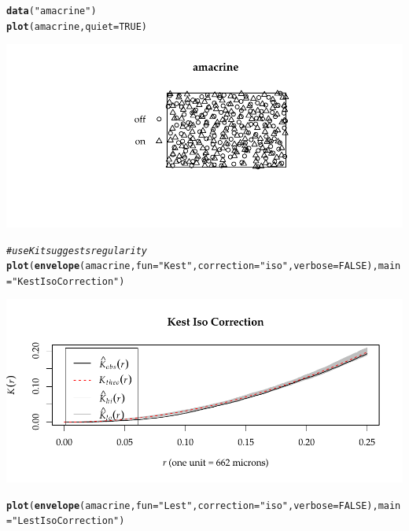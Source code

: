 \documentclass{article}\usepackage[]{graphicx}\usepackage[]{color}
\makeatletter
\def\maxwidth{ %
  \ifdim\Gin@nat@width>\linewidth
    \linewidth
  \else
    \Gin@nat@width
  \fi
}
\newcommand{\hlnum}[1]{\textcolor[rgb]{0.686,0.059,0.569}{#1}}%
\newcommand{\hlstr}[1]{\textcolor[rgb]{0.192,0.494,0.8}{#1}}%
\newcommand{\hlcom}[1]{\textcolor[rgb]{0.678,0.584,0.686}{\textit{#1}}}%
\newcommand{\hlstd}[1]{\textcolor[rgb]{0.345,0.345,0.345}{#1}}%
\newcommand{\hlkwc}[1]{\textcolor[rgb]{0.333,0.667,0.333}{#1}}%
\newcommand{\hlkwd}[1]{\textcolor[rgb]{0.737,0.353,0.396}{\textbf{#1}}}%
\newenvironment{kframe}{%
 \def\at@end@of@kframe{}%
 \ifinner\ifhmode%
  \def\at@end@of@kframe{\end{minipage}}%
  \begin{minipage}{\columnwidth}%
 \fi\fi%
 \def\FrameCommand##1{\hskip\@totalleftmargin \hskip-\fboxsep
 \colorbox{shadecolor}{##1}\hskip-\fboxsep
     \hskip-\linewidth \hskip-\@totalleftmargin \hskip\columnwidth}%
 \MakeFramed {\advance\hsize-\width
   \@totalleftmargin\z@ \linewidth\hsize
   \@setminipage}}%
 {\par\unskip\endMakeFramed%
 \at@end@of@kframe}
\newenvironment{knitrout}{}{} %
\makeatother
\begin{document}
\begin{enumerate}
\begin{knitrout}\footnotesize
{}\color{fgcolor}\begin{kframe}
\begin{alltt}
\hlkwd{data}\hlstd{(}\hlstr{"amacrine"}\hlstd{)}
\hlkwd{plot}\hlstd{(amacrine,} \hlkwc{quiet} \hlstd{=} \hlnum{TRUE}\hlstd{)}
\end{alltt}
\end{kframe}

{\centering \includegraphics[width=\maxwidth]{figure/prob3-1} 

}


\begin{kframe}\begin{alltt}
\hlcom{#use K it suggests regularity}
\hlkwd{plot}\hlstd{(}\hlkwd{envelope}\hlstd{(amacrine,} \hlkwc{fun} \hlstd{=} \hlstr{"Kest"}\hlstd{,} \hlkwc{correction} \hlstd{=} \hlstr{"iso"}\hlstd{,} \hlkwc{verbose} \hlstd{=} \hlnum{FALSE}\hlstd{),} \hlkwc{main} \hlstd{=} \hlstr{"Kest Iso Correction"}\hlstd{)}
\end{alltt}
\end{kframe}

{\centering \includegraphics[width=\maxwidth]{figure/prob3-2} 

}


\begin{kframe}\begin{alltt}
\hlkwd{plot}\hlstd{(}\hlkwd{envelope}\hlstd{(amacrine,} \hlkwc{fun} \hlstd{=} \hlstr{"Lest"}\hlstd{,} \hlkwc{correction} \hlstd{=} \hlstr{"iso"}\hlstd{,} \hlkwc{verbose} \hlstd{=} \hlnum{FALSE}\hlstd{),} \hlkwc{main} \hlstd{=} \hlstr{"Lest Iso Correction"}\hlstd{)}
\end{alltt}
\end{kframe}


\end{knitrout}
\end{enumerate}
\end{document}
